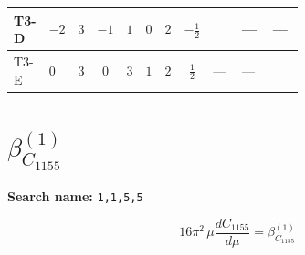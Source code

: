 \documentclass[8pt]{article}
\begin{document}
\begin{landscape}
\begin{longtable}{@{}llcccccc >{\raggedright\arraybackslash}p{0.21\linewidth} >{\raggedright\arraybackslash}p{0.21\linewidth} >{\raggedright\arraybackslash}p{0.21\linewidth}@{}}
\midrule
T3-D & $-2$ & $3$ & $-1$ & $1$ & $0$ & $2$ & $-\frac{1}{2}$ & \scriptsize\adjustbox{max width=\linewidth}{$\begin{gathered} - \frac{2 \sqrt{3} lambdaT_{3} \overline{y_{1}} \overline{y_{2}}}{3 MF}\end{gathered}$} & --- & --- \\
\midrule
T3-E & $0$ & $3$ & $0$ & $3$ & $1$ & $2$ & $\frac{1}{2}$ & --- & --- & \scriptsize\adjustbox{max width=\linewidth}{$\begin{gathered} \frac{2 \sqrt{6} lambdaT_{3} \overline{y_{1}} \overline{y_{2}}}{3 MF}\end{gathered}$} \\
\midrule
\bottomrule
\end{longtable}
\clearpage
\section*{$\beta_{C_{1155}}^{(1)}$}
\noindent\textbf{Search name: }\texttt{1,1,5,5}\par\smallskip
\[16\pi^2\,\mu\frac{d C_{1155}}{d\mu}=\beta_{C_{1155}}^{(1)}\]

\end{landscape}
\end{document}
